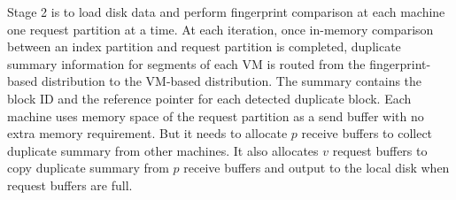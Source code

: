 Stage  2 is to load disk data and perform fingerprint comparison at each machine one request partition at a time.
At each iteration, once in-memory comparison between an index partition and request partition is completed,  
duplicate summary information for segments of each VM is routed from the fingerprint-based distribution  to the
VM-based distribution.  The summary contains the block ID and  the reference pointer for each detected duplicate block.   
Each machine uses memory space of the request partition as a send buffer with no extra memory requirement.
But it needs to allocate $p$ receive buffers to collect duplicate summary from other machines.
It also allocates $v$ request buffers to copy duplicate summary from $p$ receive buffers and output to the local disk
when request buffers are full.


